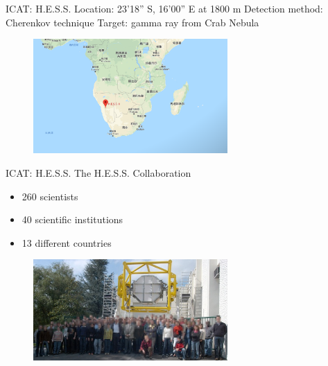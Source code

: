 \documentclass{beamer}
\begin{document}
\begin{frame}{ICAT: H.E.S.S.}
	Location: 23'18'' S, 16'00'' E at 1800 m
	\newline
	Detection method: Cherenkov technique
	\newline
	Target: gamma ray from Crab Nebula
	\newline
	\begin{figure}[h]
		\includegraphics[width=280px]{HESS_location.png}
	\end{figure}
\end{frame}


\begin{frame}{ICAT: H.E.S.S.}
	The H.E.S.S. Collaboration
	\begin{itemize}
		\item 260 scientists
		\item 40 scientific institutions
		\item 13 different countries
	\end{itemize}
	\begin{figure}[h]
		\includegraphics[width=280px]{hess_collaboration.jpg}
	\end{figure}
\end{frame}
\end{document}
